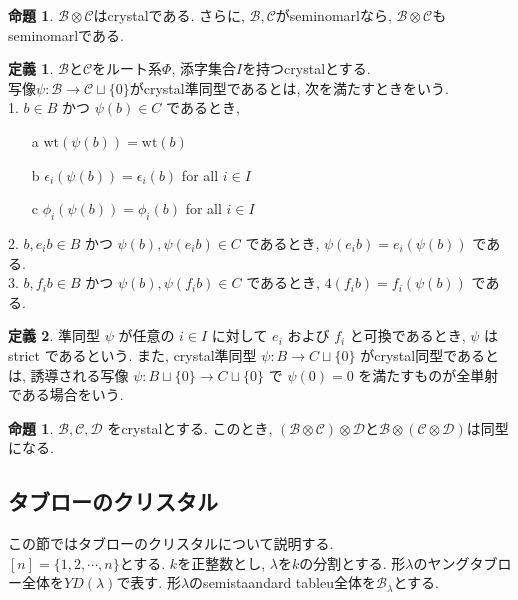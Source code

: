 \documentclass[a4,12pt, titlepage]{jarticle}
\theoremstyle{definition}
\newtheorem{df}{定義}
\newtheorem{prop}[thm]{命題}
\begin{document}
\begin{prop}
  $\mathscr{B} \otimes \mathscr{C}$はcrystalである. さらに, $\mathscr{B}, \mathscr{C}$がseminomarlなら, $\mathscr{B} \otimes \mathscr{C}$もseminomarlである. 
\end{prop}

\begin{df}
  $\mathscr{B}と\mathscr{C}$をルート系$\Phi$, 添字集合$I$を持つcrystalとする. \\
  写像$ \psi : \mathscr{B} \to \mathscr{C} \sqcup \{ 0 \}$がcrystal準同型であるとは, 次を満たすときをいう. \\
  1. $b \in B$ かつ $\psi(b) \in C$ であるとき, 
    \begin{enumerate}
      \item[a] $\mathrm{wt}(\psi(b)) = \mathrm{wt}(b)$
      \item[b] $\epsilon_i(\psi(b)) = \epsilon_i(b)$ for all $i \in I$
      \item[c]$\phi_i(\psi(b)) = \phi_i(b)$ for all $i \in I$
    \end{enumerate}
  2. $b, e_i b \in B$ かつ $\psi(b), \psi(e_i b) \in C$ であるとき, $\psi(e_i b) = e_i(\psi(b))$ である. \\
  3. $b, f_i b \in B$ かつ $\psi(b), \psi(f_i b) \in C$ であるとき, $4(f_i b) = f_i(\psi(b))$ である.
\end{df}

\begin{df}
準同型 $\psi$ が任意の $i \in I$ に対して $e_i$ および $f_i$ と可換であるとき, $\psi$ は strict であるという.
また, crystal準同型 $\psi : B \to C \sqcup \{ 0 \}$ がcrystal同型であるとは, 誘導される写像 $\psi : B \sqcup \{ 0 \} \to C \sqcup \{ 0 \}$ で $\psi(0) = 0$ を満たすものが全単射である場合をいう.
\end{df}

\begin{prop}
  $\mathscr{B}, \mathscr{C}, \mathscr{D}$ をcrystalとする.
  このとき, $(\mathscr{B} \otimes \mathscr{C}) \otimes \mathscr{D}$と$\mathscr{B} \otimes (\mathscr{C} \otimes \mathscr{D})$は同型になる. 

\end{prop}

%
\subsection{タブローのクリスタル}
この節ではタブローのクリスタルについて説明する. \\
$ [n] = \{ 1, 2, \cdots , n \} $とする.
$k$を正整数とし, $\lambda$を$k$の分割とする.
形$\lambda$のヤングタブロー全体を$YD(\lambda)$で表す.
形$\lambda$のsemistaandard tableu全体を$\mathscr{B_\lambda}$とする.
\bigskip
\end{document}
